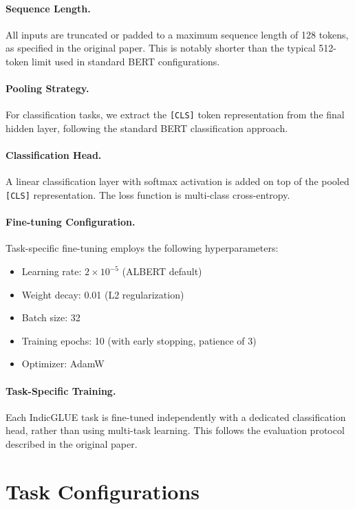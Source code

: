 \paragraph{Sequence Length.} All inputs are truncated or padded to a maximum sequence length of 128 tokens, as specified in the original paper. This is notably shorter than the typical 512-token limit used in standard BERT configurations.

\paragraph{Pooling Strategy.} For classification tasks, we extract the \texttt{[CLS]} token representation from the final hidden layer, following the standard BERT classification approach.

\paragraph{Classification Head.} A linear classification layer with softmax activation is added on top of the pooled \texttt{[CLS]} representation. The loss function is multi-class cross-entropy.

\paragraph{Fine-tuning Configuration.} Task-specific fine-tuning employs the following hyperparameters:
\begin{itemize}
    \item Learning rate: $2 \times 10^{-5}$ (ALBERT default)
    \item Weight decay: 0.01 (L2 regularization)
    \item Batch size: 32
    \item Training epochs: 10 (with early stopping, patience of 3)
    \item Optimizer: AdamW
\end{itemize}

\paragraph{Task-Specific Training.} Each IndicGLUE task is fine-tuned independently with a dedicated classification head, rather than using multi-task learning. This follows the evaluation protocol described in the original paper.

\section{Task Configurations}
\label{sec:task-configs}

